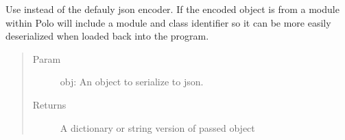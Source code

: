 \documentclass[letterpaper,10pt,english]{sphinxmanual}
\begin{document}
\begin{fulllineitems}

\begin{fulllineitems}
\label{\detokenize{polo.utils:polo.utils.io_utils.XtalWriter.header_flag}}
\end{fulllineitems}


\begin{fulllineitems}
\label{\detokenize{polo.utils:polo.utils.io_utils.XtalWriter.header_line}}
\end{fulllineitems}


\begin{fulllineitems}
\label{\detokenize{polo.utils:polo.utils.io_utils.XtalWriter.json_encoder}}
Use instead of the defauly json encoder. If the encoded object
is from a module within Polo will include a module and class
identifier so it can be more easily deserialized when loaded
back into the program.
\begin{quote}\begin{description}
\item[{Param}] \leavevmode
obj: An object to serialize to json.

\item[{Returns}] \leavevmode
A dictionary or string version of passed object

\end{description}\end{quote}

\end{fulllineitems}



\end{fulllineitems}
\end{document}
